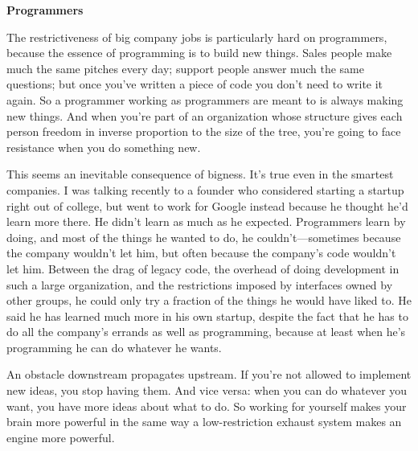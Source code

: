                     \textbf{Programmers}

The restrictiveness of big
                    company jobs is particularly hard on programmers, because
                    the essence of programming is to build new things. Sales
                    people make much the same pitches every day; support people
                    answer much the same questions; but once you've written a
                    piece of code you don't need to write it again. So a
                    programmer working as programmers are meant to is always
                    making new things. And when you're part of an organization
                    whose structure gives each person freedom in inverse
                    proportion to the size of the tree, you're going to face
                    resistance when you do something new.

This seems
                    an inevitable consequence of bigness. It's true even in the
                    smartest companies. I was talking recently to a founder who
                    considered starting a startup right out of college, but went
                    to work for Google instead because he thought he'd learn
                    more there. He didn't learn as much as he expected.
                    Programmers learn by doing, and most of the things he wanted
                    to do, he couldn't---sometimes because the company
                    wouldn't let him, but often because the company's code
                    wouldn't let him. Between the drag of legacy code, the
                    overhead of doing development in such a large organization,
                    and the restrictions imposed by interfaces owned by other
                    groups, he could only try a fraction of the things he would
                    have liked to. He said he has learned much more in his own
                    startup, despite the fact that he has to do all the
                    company's errands as well as programming, because at least
                    when he's programming he can do whatever he wants.

An
                    obstacle downstream propagates upstream. If you're not
                    allowed to implement new ideas, you stop having them. And
                    vice versa: when you can do whatever you want, you have more
                    ideas about what to do. So working for yourself makes your
                    brain more powerful in the same way a low-restriction
                    exhaust system makes an engine more powerful.

